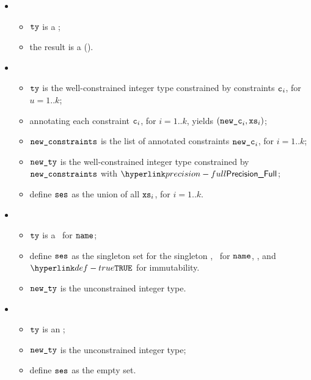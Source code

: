 \ProseParagraph
\OneApplies
\begin{itemize}
  \item {}
    \begin{itemize}
      \item $\texttt{ty}$ is a \pendingconstrainedintegertype;
      \item the result is a \typingerrorterm{} (\UnexpectedType).
    \end{itemize}
  \item {}
    \begin{itemize}
      \item $\texttt{ty}$ is the well-constrained integer type constrained by
        constraints $\texttt{c}_i$, for $u=1..k$;
      \item annotating each constraint $\texttt{c}_i$, for $i=1..k$,
      yields $(\texttt{new\_c}_i, \texttt{xs}_i)$\ProseOrTypeError;
      \item $\texttt{new\_constraints}$ is the list of annotated constraints $\texttt{new\_c}_i$,
      for $i=1..k$;
      \item $\texttt{new\_ty}$ is the well-constrained integer type constrained
        by $\texttt{new\_constraints}$ with $\PrecisionFull$;
      \item define $\texttt{ses}$ as the union of all $\texttt{xs}_i$, for $i=1..k$.
    \end{itemize}

    \item {}
    \begin{itemize}
      \item $\texttt{ty}$ is a \parameterizedintegertype\ for $\texttt{name}$;
      \item define $\texttt{ses}$ as the singleton set for the singleton \sideeffectdescriptorterm,
            \ReadLocalTerm\ for $\texttt{name}$, \timeframeconstant, and $\True$ for immutability.
      \item $\texttt{new\_ty}$ is the unconstrained integer type.
    \end{itemize}

    \item {}
    \begin{itemize}
      \item $\texttt{ty}$ is an \unconstrainedintegertype;
      \item $\texttt{new\_ty}$ is the unconstrained integer type;
      \item define $\texttt{ses}$ as the empty set.
    \end{itemize}
  \end{itemize}

